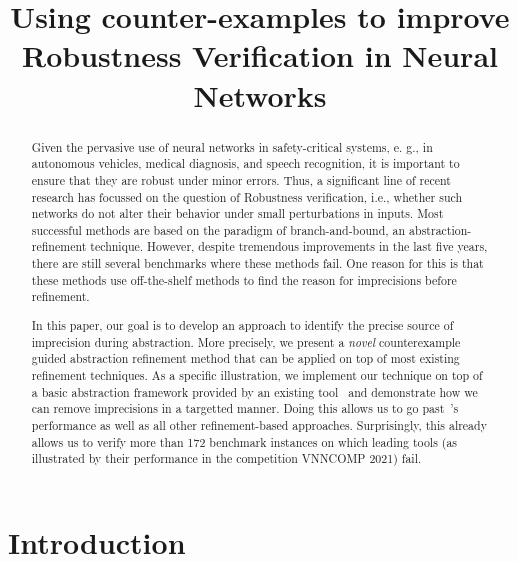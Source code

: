 \documentclass{llncs}
\title{Using counter-examples to improve Robustness Verification in Neural Networks}
\author{}
\institute{}
\begin{document}
\maketitle

\begin{abstract}
  Given the pervasive use of neural networks in safety-critical systems, e. g., in autonomous vehicles, medical diagnosis, and speech recognition, it is important to ensure that they are robust under minor errors. Thus, a significant line of recent research has focussed on the question of Robustness verification, i.e., whether such networks do not alter their behavior under small perturbations in inputs. Most successful methods are based on the paradigm of branch-and-bound, an abstraction-refinement technique. However, despite tremendous improvements in the last five years, there are still several benchmarks where these methods fail. One reason for this is that these methods use off-the-shelf methods to find the reason for imprecisions before refinement.  %

In this paper, our goal is to develop an approach to identify the precise source of imprecision during abstraction. More precisely, we present a {\em novel} counterexample guided abstraction refinement method that can be applied on top of most existing refinement techniques. As a specific illustration, we implement our technique on top of a basic abstraction framework provided by an existing tool~\deeppoly{} and demonstrate how we can remove imprecisions in a targetted manner. Doing this allows us to go past~\deeppoly{}'s performance as well as all other refinement-based approaches. Surprisingly, this already allows us to verify more than 172 benchmark instances on which leading tools (as illustrated by their performance in the competition VNNCOMP 2021) fail. 

\end{abstract}

\section{Introduction}
\label{sec:intro}

\end{document}
